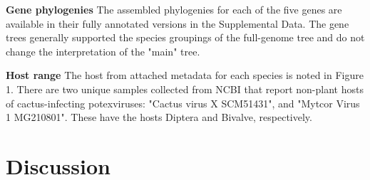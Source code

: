 \documentclass{article}
\begin{document}
\textbf{Gene phylogenies}
The assembled phylogenies for each of the five genes are available in their fully annotated versions in the Supplemental Data. The gene trees generally supported the species groupings of the full-genome tree and do not change the interpretation of the "main" tree. 

\textbf{Host range }
The host from attached metadata for each species is noted in Figure 1. There are two unique samples collected from NCBI that report non-plant hosts of cactus-infecting potexviruses: "Cactus virus X SCM51431", and "Mytcor Virus 1 MG210801". These have the hosts Diptera and Bivalve, respectively. 

\section*{Discussion}

\medskip


\end{document}
